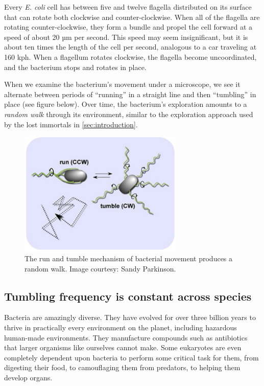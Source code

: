 Every \textit{E. coli} cell has between five and twelve flagella distributed on its surface that can rotate both clockwise and counter-clockwise. When all of the flagella are rotating counter-clockwise, they form a bundle and propel the cell forward at a speed of about 20 µm per second. This speed may seem insignificant, but it is about ten times the length of the cell per second, analogous to a car traveling at 160 kph. When a flagellum rotates clockwise, the flagella become uncoordinated, and the bacterium stops and rotates in place.

When we examine the bacterium's movement under a microscope, we see it alternate between periods of ``running'' in a straight line and then ``tumbling'' in place (see figure below). Over time, the bacterium's  exploration amounts to a \textit{random walk} through its environment, similar to the exploration approach used by the lost immortals in \autoref{sec:introduction}.

\begin{figure}[h]
\centering
\mySfFamily
\includegraphics[width = 0.7\textwidth]{../images/chemotaxis_intro_runtumble.png}
\caption{The run and tumble mechanism of bacterial movement produces a random walk. Image courtesy: Sandy Parkinson.}
\label{fig:chemotaxis_intro_runtumble}
\end{figure}

\FloatBarrier
{}
\subsection{Tumbling frequency is constant across species}

Bacteria are amazingly diverse. They have evolved for over three billion years to thrive in practically every environment on the planet, including hazardous human-made environments. They manufacture compounds such as antibiotics that larger organisms like ourselves cannot make. Some eukaryotes are even completely dependent upon bacteria to perform some critical task for them, from digesting their food, to camouflaging them from predators, to helping them develop organs.

